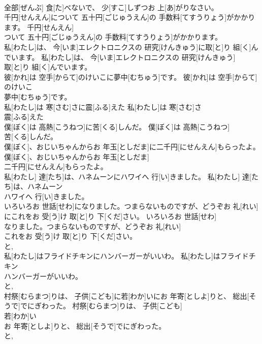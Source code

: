 \documentclass[8pt]{extreport}
\begin{document}
\begin{CJK}{UTF8}{min}
\\	全部[ぜんぶ] 食[た]べないで、 少[すこ]しずつお 上[あ]がりなさい。	
\\	千円[せんえん]について 五十円[ごじゅうえん]の 手数料[てすうりょう]がかかります。	千円[せんえん]
\\	ついて 五十円[ごじゅうえん]の 手数料[てすうりょう]がかかります。	
\\	私[わたし]は、 今[いま]エレクトロニクスの 研究[けんきゅう]に取[と]り 組[く]んでいます。	私[わたし]は、 今[いま]エレクトロニクスの 研究[けんきゅう]
\\	取[と]り 組[く]んでいます。	
\\	彼[かれ]は 空手[からて]のけいこに夢中[むちゅう]です。	彼[かれ]は 空手[からて]のけいこ
\\	夢中[むちゅう]です。	
\\	私[わたし]は 寒[さむ]さに震[ふる]えた	私[わたし]は 寒[さむ]さ
\\	震[ふる]えた	
\\	僕[ぼく]は 高熱[こうねつ]に苦[くる]しんだ。	僕[ぼく]は 高熱[こうねつ]
\\	苦[くる]しんだ。	
\\	僕[ぼく]、おじいちゃんからお 年玉[としだま]に二千円[にせんえん]もらったよ。	僕[ぼく]、おじいちゃんからお 年玉[としだま]
\\	二千円[にせんえん]もらったよ。	
\\	私[わたし] 達[たち]は、ハネムーンにハワイへ 行[い]きました。	私[わたし] 達[たち]は、ハネムーン
\\	ハワイへ 行[い]きました。	
\\	いろいろお 世話[せわ]になりました。つまらないものですが、どうぞお 礼[れい]にこれをお 受[う]け 取[と]り 下[くだ]さい。	いろいろお 世話[せわ]
\\	なりました。つまらないものですが、どうぞお 礼[れい]
\\	これをお 受[う]け 取[と]り 下[くだ]さい。	
\\	と, 
\\	私[わたし]はフライドチキンにハンバーガーがいいわ。	私[わたし]はフライドチキン
\\	ハンバーガーがいいわ。	
\\	と, 
\\	村祭[むらまつ]りは、 子供[こども]に若[わか]いにお 年寄[としよ]りと、 総出[そうで]でにぎわった。	村祭[むらまつ]りは、 子供[こども]
\\	若[わか]い
\\	お 年寄[としよ]りと、 総出[そうで]でにぎわった。	
\\	と, 

\end{CJK}
\end{document}
